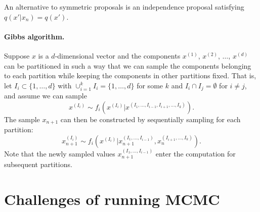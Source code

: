 \documentclass[12pt,a4paper]{report}
\begin{document}
An alternative to symmetric proposals is an independence proposal satisfying $q(x'|x_n) = q(x')$.


\paragraph{Gibbs algorithm.} Suppose $x$ is a $d$-dimensional vector and the components $x^{(1)}$, $x^{(2)}$, $\dots$, $x^{(d)}$ can be partitioned in such a way that we can sample the components belonging to each partition while keeping the components in other partitions fixed. That is, let $I_i \subset \{1, \dots, d\}$ with $\cup_{i=1}^k I_i = \{1, \dots, d\}$ for some $k$ and $I_i \cap I_j = \emptyset$ for $i \neq j$, and assume we can sample
$$x^{(I_i)} \sim f_i\left(x^{(I_i)} | x^{(I_1, \dots, I_{i-1}, I_{i+1}, \dots, I_k)}\right).$$
The sample $x_{n+1}$ can then be constructed by sequentially sampling for each partition:
$$x_{n+1}^{(I_i)} \sim f_i\left(x^{(I_i)} | x_{n+1}^{(I_1, \dots, I_{i-1})}, x_n^{(I_{i+1}, \dots, I_k)}\right).$$
Note that the newly sampled values $x_{n+1}^{(I_1, \dots, I_{i-1})}$ enter the computation for subsequent partitions.




\section{Challenges of running MCMC}
\end{document}
